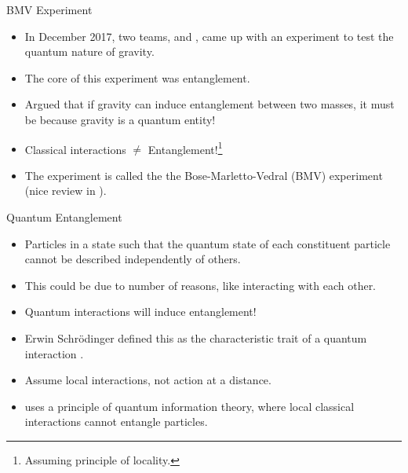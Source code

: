 \documentclass[12pt,aspectratio=1610]{beamer}
\begin{document}
\begin{frame}{BMV Experiment}
\begin{itemize}
    \item <1-> In December 2017, two teams, \citet{Bose_2017} and \citet{Marletto_2017}, came up with an experiment to test the quantum nature of gravity.
    \item <2-> The core of this experiment was entanglement.
    \item <3-> Argued that if gravity can induce entanglement between two masses, it must be because gravity is a quantum entity! 
    \item <4-> Classical interactions $\neq$ Entanglement!\footnote{Assuming principle of locality.}
    \item <5-> The experiment is called the the Bose-Marletto-Vedral (BMV) experiment (nice review in \citet{Christodoulou_2020}).
\end{itemize}
\end{frame}

\begin{frame}{Quantum Entanglement}
    \begin{itemize}
        \item <1-> Particles in a state such that the quantum state of each constituent particle cannot be described independently of others.
        \item <2-> This could be due to number of reasons, like interacting with each other.
        \item <3-> Quantum interactions will induce entanglement!
        \item <4-> Erwin Schr\"odinger defined this as the characteristic trait of a quantum interaction \cite{schrodinger_1935}.
        \item <5-> Assume local interactions, not action at a distance.
        \item <6-> \citet{Bose_2022} uses a principle of quantum information theory, where local classical interactions cannot entangle particles.
    \end{itemize}
\end{frame}
\end{document}
